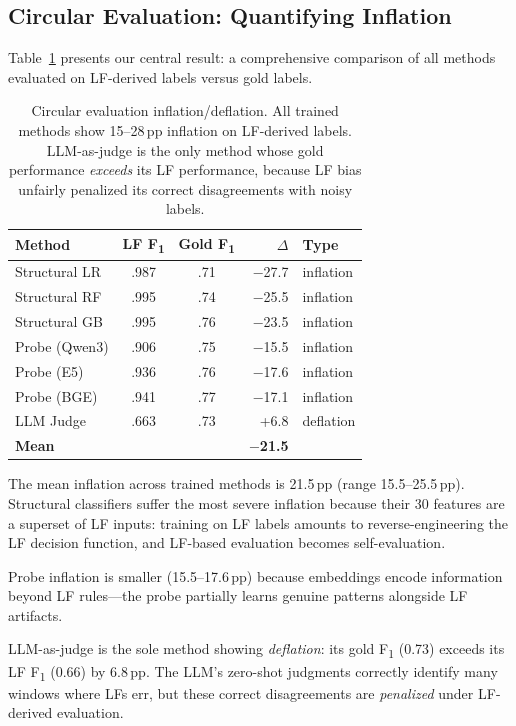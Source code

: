 \documentclass[11pt,a4paper]{article}
\newcommand{\fone}{F\textsubscript{1}}
\newcommand{\pp}{\,pp}
\begin{document}
\subsection{Circular Evaluation: Quantifying Inflation}
\label{sec:circular}

Table~\ref{tab:inflation} presents our central result: a comprehensive comparison of all methods evaluated on LF-derived labels versus gold labels.

\begin{table}[t]
\centering
\small
\begin{tabular}{lccrl}
\toprule
\textbf{Method} & \textbf{LF \fone} & \textbf{Gold \fone} & \textbf{$\Delta$} & \textbf{Type} \\
\midrule
Structural LR & .987 & .71 & $-$27.7 & inflation \\
Structural RF & .995 & .74 & $-$25.5 & inflation \\
Structural GB & .995 & .76 & $-$23.5 & inflation \\
Probe (Qwen3) & .906 & .75 & $-$15.5 & inflation \\
Probe (E5) & .936 & .76 & $-$17.6 & inflation \\
Probe (BGE) & .941 & .77 & $-$17.1 & inflation \\
LLM Judge & .663 & .73 & +6.8 & deflation \\
\midrule
\textbf{Mean} & & & $-$\textbf{21.5} & \\
\bottomrule
\end{tabular}
\caption{Circular evaluation inflation/deflation. All trained methods show 15--28\pp{} inflation on LF-derived labels. LLM-as-judge is the only method whose gold performance \emph{exceeds} its LF performance, because LF bias unfairly penalized its correct disagreements with noisy labels.}
\label{tab:inflation}
\end{table}

The mean inflation across trained methods is 21.5\pp{} (range 15.5--25.5\pp).
Structural classifiers suffer the most severe inflation because their 30 features are a superset of LF inputs: training on LF labels amounts to reverse-engineering the LF decision function, and LF-based evaluation becomes self-evaluation.

Probe inflation is smaller (15.5--17.6\pp) because embeddings encode information beyond LF rules---the probe partially learns genuine patterns alongside LF artifacts.

LLM-as-judge is the sole method showing \emph{deflation}: its gold \fone{} (0.73) exceeds its LF \fone{} (0.66) by 6.8\pp.
The LLM's zero-shot judgments correctly identify many windows where LFs err, but these correct disagreements are \emph{penalized} under LF-derived evaluation.
\end{document}
